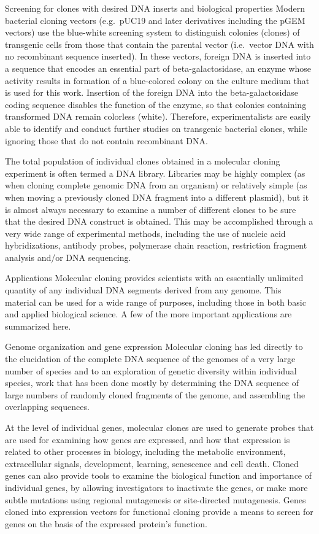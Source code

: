 Screening for clones with desired DNA inserts and biological properties
Modern bacterial cloning vectors (e.g.~pUC19 and later derivatives including the pGEM vectors) use the blue-white screening system to distinguish colonies (clones) of transgenic cells from those that contain the parental vector (i.e.~vector DNA with no recombinant sequence inserted). In these vectors, foreign DNA is inserted into a sequence that encodes an essential part of beta-galactosidase, an enzyme whose activity results in formation of a blue-colored colony on the culture medium that is used for this work. Insertion of the foreign DNA into the beta-galactosidase coding sequence disables the function of the enzyme, so that colonies containing transformed DNA remain colorless (white). Therefore, experimentalists are easily able to identify and conduct further studies on transgenic bacterial clones, while ignoring those that do not contain recombinant DNA.

The total population of individual clones obtained in a molecular cloning experiment is often termed a DNA library. Libraries may be highly complex (as when cloning complete genomic DNA from an organism) or relatively simple (as when moving a previously cloned DNA fragment into a different plasmid), but it is almost always necessary to examine a number of different clones to be sure that the desired DNA construct is obtained. This may be accomplished through a very wide range of experimental methods, including the use of nucleic acid hybridizations, antibody probes, polymerase chain reaction, restriction fragment analysis and/or DNA sequencing.

Applications
Molecular cloning provides scientists with an essentially unlimited quantity of any individual DNA segments derived from any genome. This material can be used for a wide range of purposes, including those in both basic and applied biological science. A few of the more important applications are summarized here.

Genome organization and gene expression
Molecular cloning has led directly to the elucidation of the complete DNA sequence of the genomes of a very large number of species and to an exploration of genetic diversity within individual species, work that has been done mostly by determining the DNA sequence of large numbers of randomly cloned fragments of the genome, and assembling the overlapping sequences.

At the level of individual genes, molecular clones are used to generate probes that are used for examining how genes are expressed, and how that expression is related to other processes in biology, including the metabolic environment, extracellular signals, development, learning, senescence and cell death. Cloned genes can also provide tools to examine the biological function and importance of individual genes, by allowing investigators to inactivate the genes, or make more subtle mutations using regional mutagenesis or site-directed mutagenesis. Genes cloned into expression vectors for functional cloning provide a means to screen for genes on the basis of the expressed protein's function.

